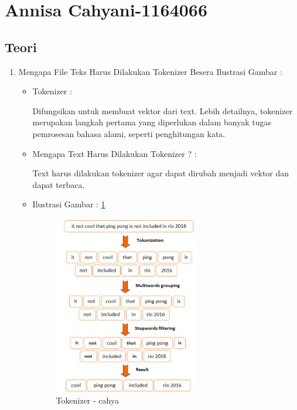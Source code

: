 \section{Annisa Cahyani-1164066}
\subsection{Teori}
\begin{enumerate}
\item Mengapa File Teks Harus Dilakukan Tokenizer Besera Ilustrasi Gambar :
\begin{itemize}
\item Tokenizer :
\par Difungsikan untuk membuat vektor dari text. Lebih detailnya, tokenizer merupakan langkah pertama yang diperlukan dalam banyak tugas pemrosesan bahasa alami, seperti penghitungan kata.
\par
\par
\item Mengapa Text Harus Dilakukan Tokenizer ? :
\par Text harus dilakukan tokenizer agar dapat dirubah menjadi vektor dan dapat terbaca.
\par
\par
\item Ilustrasi Gambar : \ref{chapter-7-no-1-cahya}
\par
\begin{figure}[!hbtp]
\centering
\includegraphics[scale=0.2]{figures/Chapter 7/1164066/Teori/chapter-7-no-1-cahya.jpg}
\caption{Tokenizer - cahya}
\label{chapter-7-no-1-cahya}
\end{figure}
\par
\end{itemize}
\par
\par

\end{enumerate}

